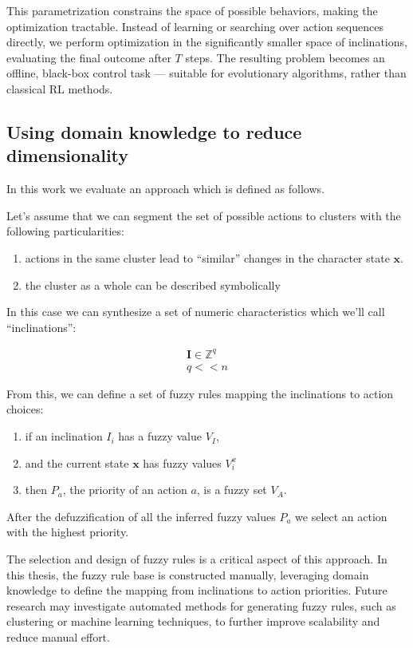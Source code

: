 \documentclass[11pt, a4paper]{article}
\begin{document}
This parametrization constrains the space of possible behaviors, making the optimization tractable. Instead of learning or searching over action sequences directly, we perform optimization in the significantly smaller space of inclinations, evaluating the final outcome after $T$ steps. The resulting problem becomes an offline, black-box control task — suitable for evolutionary algorithms, rather than classical RL methods.

	\subsection{Using domain knowledge to reduce dimensionality}

	In this work we evaluate an approach which is defined as follows.
	
	Let's assume that we can segment the set of possible actions to clusters with the following particularities:
	
	\begin{enumerate}
		\item actions in the same cluster lead to ``similar'' changes in the character state $\mathbf{x}$.
		\item the cluster as a whole can be described symbolically
	\end{enumerate}
	
	In this case we can synthesize a set of numeric characteristics which we'll call ``inclinations'':
	
	\begin{eqnarray}
		\mathbf{I} \in \mathbb{Z}^q\\
		q << n \label{q<<n}
	\end{eqnarray}

	From this, we can define a set of fuzzy rules\cite{ray2014softcomputing} mapping the inclinations to action choices:

	\begin{enumerate}
		\item if an inclination $I_i$ has a fuzzy value $V_I$,
		\item and the current state $\mathbf{x}$ has fuzzy values $V^x_i$
		\item then $P_a$, the priority of an action $a$, is a fuzzy set $V_A$.
	\end{enumerate}
	
	After the defuzzification of all the inferred fuzzy values $P_a$ we select an action with the highest priority.
	
	The selection and design of fuzzy rules is a critical aspect of this approach.
	In this thesis, the fuzzy rule base is constructed manually, leveraging domain knowledge to define the mapping from inclinations to action priorities.
	Future research may investigate automated methods for generating fuzzy rules, such as clustering or machine learning techniques, to further improve scalability and reduce manual effort.
\end{document}
